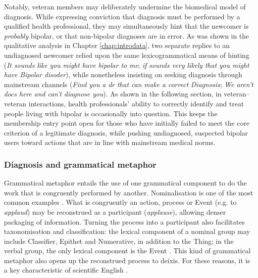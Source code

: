 \documentclass{article}
\renewcommand{\cite}{\parencite}
\begin{document}
Notably, veteran members may deliberately undermine the biomedical model of diagnosis. While expressing conviction that diagnosis must be performed by a qualified health professional, they may simultaneously hint that the newcomer is \emph{probably} bipolar, or that non-bipolar diagnoses are in error. As was shown in the qualitative analysis in Chapter \ref{chap:introdata}, two separate replies to an undiagnosed newcomer relied upon the same lexicogrammatical means of hinting (\emph{It sounds like you might have bipolar to me}; \emph{if sounds very likely that you might have Bipolar disoder}), while nonetheless insisting on seeking diagnosis through mainstream channels (\emph{Find you a dr that can make a correct Diagnosis}; \emph{We aren't docs here and can't diagnose you}). As shown in the following section, in veteran--veteran interactions, health professionals' ability to correctly identify and treat people living with bipolar is occasionally into question. This keeps the membership entry point open for those who have initially failed to meet the core criterion of a legitimate diagnosis, while pushing undiagnosed, suspected bipolar users toward actions that are in line with mainstream medical norms. %

\subsubsection{Diagnosis and grammatical metaphor}

Grammatical metaphor entails the use of one grammatical component to do the work that is congruently performed by another. Nominalisation is one of the most common examples \cite{simon-vandenbergen_grammatical_2003}. What is congruently an action, process or Event (e.g. to \emph{applaud}) may be reconstrued as a participant (\emph{applause}), allowing denser packaging of information. Turning the process into a participant also facilitates taxonomisation and classification: the lexical component of a nominal group may include Classifier, Epithet and Numerative, in addition to the Thing; in the verbal group, the only lexical component is the Event \cite{halliday_introduction_2004}. This kind of grammatical metaphor also opens up the reconstrued process to deixis. For these reasons, it is a key characteristic of scientific English \cite{halliday1999construing}. 
\end{document}
